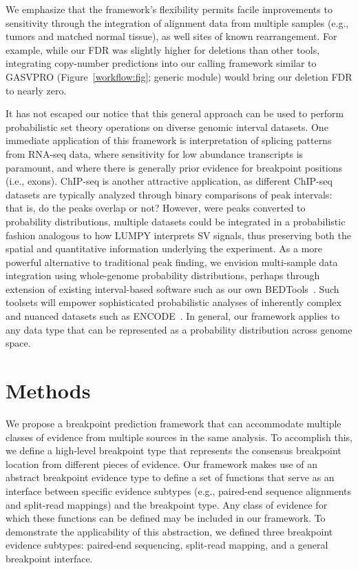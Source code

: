 \documentclass[10pt]{bmc_article}
\newenvironment{bmcformat}{\begin{raggedright}\baselineskip20pt\sloppy\setboolean{publ}{false}}{\end{raggedright}\baselineskip20pt\sloppy}
\begin{document}
\begin{bmcformat}
We emphasize that the framework's flexibility permits facile improvements to
sensitivity through the integration of alignment data from multiple samples
(e.g., tumors and matched normal tissue), as well sites of known rearrangement.
For example, while our FDR was slightly higher for deletions than other tools,
integrating copy-number predictions into our calling framework similar to
GASVPRO (Figure~\ref{workflow:fig}; generic module) would bring our deletion FDR to nearly zero.

It has not escaped our notice that this general approach can be used to perform
probabilistic set theory operations on diverse genomic interval datasets. One
immediate application of this framework is interpretation of splicing patterns
from RNA-seq data, where sensitivity for low abundance transcripts is paramount,
and where there is generally prior evidence for breakpoint positions (i.e.,
exons). ChIP-seq is another attractive application, as different ChIP-seq
datasets are typically analyzed through binary comparisons of peak intervals:
that is, do the peaks overlap or not? However, were peaks converted to
probability distributions, multiple datasets could be integrated in a
probabilistic fashion analogous to how LUMPY interprets SV signals, thus
preserving both the spatial and quantitative information underlying the
experiment. As a more powerful alternative to traditional peak finding, we
envision multi-sample data integration using whole-genome probability
distributions, perhaps through extension of existing interval-based software
such as our own BEDTools~\cite{quinlan2010a}. Such toolsets will empower
sophisticated probabilistic analyses of inherently complex and nuanced datasets
such as ENCODE~\cite{encode2012}. In general, our framework applies to any data
type that can be represented as a probability distribution across genome space.


\section*{Methods}

We propose a breakpoint prediction framework that can accommodate multiple
classes of evidence from multiple sources in the same analysis.  To accomplish
this, we define a high-level breakpoint type that represents the consensus
breakpoint location from different pieces of evidence.  Our framework makes use
of an abstract breakpoint evidence type to define a set of functions that serve
as an interface between specific evidence subtypes (e.g., paired-end sequence
alignments and split-read mappings) and the breakpoint type.  Any class of
evidence for which these functions can be defined may be included in our
framework.  To demonstrate the applicability of this abstraction, we defined
three breakpoint evidence subtypes: paired-end sequencing, split-read mapping,
and a general breakpoint interface.


\end{bmcformat}
\end{document}
